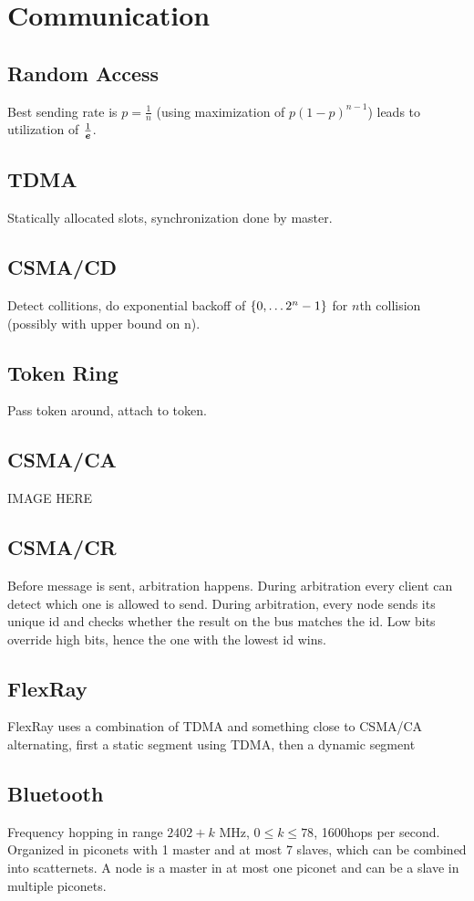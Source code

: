 \section{Communication}
\subsection{Random Access}
Best sending rate is $p = \frac{1}{n}$ (using maximization of
$p \left(1 - p\right)^{n-1}$) leads to utilization of $\frac{1}{\boldsymbol{e}}$.

\subsection{TDMA}
Statically allocated slots, synchronization done by master.

\subsection{CSMA/CD}
Detect collitions, do exponential backoff of $\left\lbrace 0, \dots 2^n - 1 \right\rbrace$ for $n$th
collision (possibly with upper bound on n).

\subsection{Token Ring}
Pass token around, attach to token.

\subsection{CSMA/CA}
IMAGE HERE

\subsection{CSMA/CR}
Before message is sent, arbitration happens. During arbitration every client can
detect which one is allowed to send. During arbitration, every node sends its
unique id and checks whether the result on the bus matches the id. Low bits
override high bits, hence the one with the lowest id wins.

\subsection{FlexRay}
FlexRay uses a combination of TDMA and something close to CSMA/CA alternating,
first a static segment using TDMA, then a dynamic segment

\subsection{Bluetooth}
Frequency hopping in range $2402 + k$ MHz, $0 \leq k \leq 78$, 1600hops per
second. Organized in piconets with 1 master and at most 7 slaves, which can be
combined into scatternets. A node is a master in at most one piconet and can be
a slave in multiple piconets.

